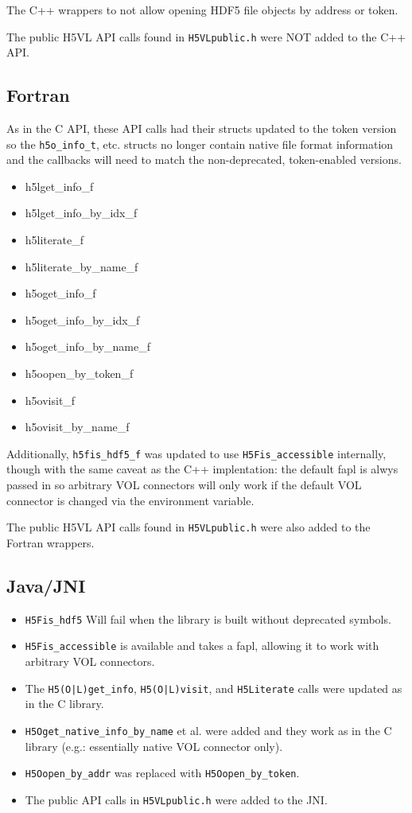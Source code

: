 The C++ wrappers to not allow opening HDF5 file objects by address or token.

The public H5VL API calls found in {\tt H5VLpublic.h} were NOT added to
the C++ API.

\subsection{Fortran}

As in the C API, these API calls had their structs updated to the token version so
the {\tt h5o\_info\_t}, etc. structs no longer contain native file format information
and the callbacks will need to match the non-deprecated, token-enabled versions.

\begin{itemize}
    \item h5lget\_info\_f
    \item h5lget\_info\_by\_idx\_f
    \item h5literate\_f
    \item h5literate\_by\_name\_f
    \item h5oget\_info\_f
    \item h5oget\_info\_by\_idx\_f
    \item h5oget\_info\_by\_name\_f
    \item h5oopen\_by\_token\_f
    \item h5ovisit\_f
    \item h5ovisit\_by\_name\_f
\end{itemize}

Additionally, {\tt h5fis\_hdf5\_f} was updated to use {\tt H5Fis\_accessible}
internally, though with the same caveat as the C++ implentation: the default
fapl is alwys passed in so arbitrary VOL connectors will only work if the
default VOL connector is changed via the environment variable.

The public H5VL API calls found in {\tt H5VLpublic.h} were also added to
the Fortran wrappers.

\subsection{Java/JNI}

\begin{itemize}
    \item {\tt H5Fis\_hdf5} Will fail when the library is built without deprecated symbols.
    \item {\tt H5Fis\_accessible} is available and takes a fapl, allowing it to work with arbitrary VOL connectors.
    \item The {\tt H5(O|L)get\_info}, {\tt H5(O|L)visit}, and {\tt H5Literate} calls were updated as in the C library.
    \item {\tt H5Oget\_native\_info\_by\_name} et al. were added and they work as in the C library (e.g.: essentially native VOL connector only).
    \item {\tt H5Oopen\_by\_addr} was replaced with {\tt H5Oopen\_by\_token}.
    \item The public API calls in {\tt H5VLpublic.h} were added to the JNI.
\end{itemize}

